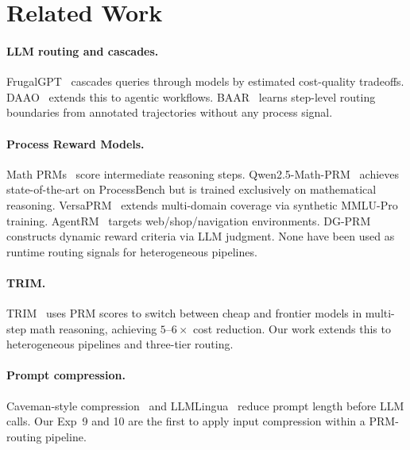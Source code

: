 \documentclass[sigconf,natbib=false]{acmart}
\begin{document}
\section{Related Work}

\paragraph{LLM routing and cascades.}
FrugalGPT~\cite{frugalgpt2023} cascades queries through models by estimated
cost-quality tradeoffs.  DAAO~\cite{daao2025} extends this to agentic
workflows.  BAAR~\cite{baar2026} learns step-level routing boundaries from
annotated trajectories without any process signal.

\paragraph{Process Reward Models.}
Math PRMs~\cite{lightman2023} score intermediate reasoning steps.
Qwen2.5-Math-PRM~\cite{qwenprm2025} achieves state-of-the-art on ProcessBench
but is trained exclusively on mathematical reasoning.
VersaPRM~\cite{versaprm2025} extends multi-domain coverage via synthetic
MMLU-Pro training.  AgentRM~\cite{agentrm2025} targets web/shop/navigation
environments.  DG-PRM~\cite{dgprm2025} constructs dynamic reward criteria via
LLM judgment.  None have been used as runtime routing signals for heterogeneous
pipelines.

\paragraph{TRIM.}
TRIM~\cite{trim2026} uses PRM scores to switch between cheap and frontier
models in multi-step math reasoning, achieving $5$--$6\times$ cost reduction.
Our work extends this to heterogeneous pipelines and three-tier routing.

\paragraph{Prompt compression.}
Caveman-style compression~\cite{jiang2023} and LLMLingua~\cite{llmlingua2023}
reduce prompt length before LLM calls.  Our Exp~9 and 10 are the first to
apply input compression within a PRM-routing pipeline.

\end{document}
